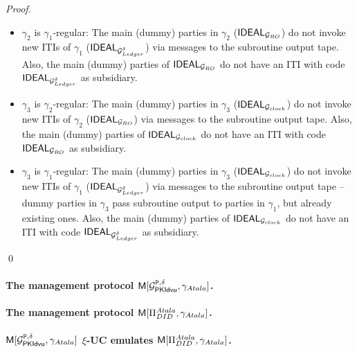 \begin{proof}
  \begin{itemize}
  \item $\gamma_2$ is $\gamma_1$-regular: The main (dummy) parties in
    $\gamma_2$ ($\mathsf{IDEAL}_{\mathcal{G}_{RO}}$) do not invoke new ITIs of $\gamma_1$
    ($\mathsf{IDEAL}_{\mathcal{G}_{Ledger}^\delta}$) via messages to the subroutine output tape.
    Also, the main (dummy) parties of $\mathsf{IDEAL}_{\mathcal{G}_{RO}}$ do not have an ITI
    with code $\mathsf{IDEAL}_{\mathcal{G}_{Ledger}^\delta}$ as subsidiary.
  \item $\gamma_3$ is $\gamma_2$-regular: The main (dummy) parties in
    $\gamma_3$ ($\mathsf{IDEAL}_{\mathcal{G}_{clock}}$) do not invoke new ITIs of $\gamma_2$
    ($\mathsf{IDEAL}_{\mathcal{G}_{RO}}$) via messages to the subroutine output tape. Also,
    the main (dummy) parties of $\mathsf{IDEAL}_{\mathcal{G}_{clock}}$ do not have an ITI with
    code $\mathsf{IDEAL}_{\mathcal{G}_{RO}}$ as subsidiary.
  \item $\gamma_3$ is $\gamma_1$-regular: The main (dummy) parties in
    $\gamma_3$ ($\mathsf{IDEAL}_{\mathcal{G}_{clock}}$) do not invoke new ITIs of $\gamma_1$
    ($\mathsf{IDEAL}_{\mathcal{G}_{Ledger}^\delta}$) via messages to the subroutine output tape --
    dummy parties in $\gamma_3$ pass subroutine output to parties in $\gamma_1$,
    but already existing ones. Also, the main (dummy) parties of
    $\mathsf{IDEAL}_{\mathcal{G}_{clock}}$ do not have an ITI with code
    $\mathsf{IDEAL}_{\mathcal{G}_{Ledger}^\delta}$ as subsidiary.
  \end{itemize}
  \qed
\end{proof}

\paragraph{The management protocol $\mathsf{M}[\mathcal{G}^{\mathtt{P},\delta}_{\mathsf{PKIdvu}},\gamma_{Atala}]$.}

\paragraph{The management protocol $\mathsf{M}[\Pi_{DID}^{Atala},\gamma_{Atala}]$.}

\paragraph{$\mathsf{M}[\mathcal{G}^{\mathtt{P},\delta}_{\mathsf{PKIdvu}},\gamma_{Atala}]$ $\xi$-UC emulates
  $\mathsf{M}[\Pi_{DID}^{Atala},\gamma_{Atala}]$.}


